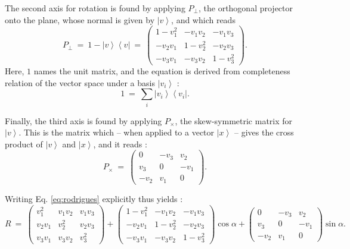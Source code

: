 The second axis for rotation is found by applying $P_{\perp}$, the orthogonal projector onto the plane, 
whose normal is given by $\left|v\right>$, and which reads \cite[p. 814]{Arens2015}
\begin{equation}
	P_{\perp} \ =\ 1 - \left|v\right> \left<v\right| \ =\ 
		\left( \begin{array}{ccc} 
			1 - v_1^2    &      - v_1 v_2 &         - v_1 v_3 \\
			   - v_2 v_1 &      1 - v_2^2 &         - v_2 v_3 \\
			   - v_3 v_1 &      - v_3 v_2 &         1 - v_3^2
		\end{array} \right).
\end{equation}
Here, $1$ names the unit matrix, and the equation is derived from completeness relation of the vector space under
a basis $\left| v_i \right>$ \cite[p. 814]{Arens2015}:
\begin{equation}
	1 \ =\  \sum_i \left| v_i \right> \left< v_i \right|.
\end{equation}

Finally, the third axis is found by applying $P_{\times}$, the skew-symmetric matrix for $\left|v\right>$.
This is the matrix which -- when applied to a vector $\left|x\right>$ -- gives the cross product of $\left|v\right>$ and $\left|x\right>$, 
and it reads \cite{wiki_skewsymm}:
\begin{equation}
	P_{\times} \ =\ 
		\left( \begin{array}{ccc} 
			0       & -v_3 &  v_2 \\
			v_3   & 0      & -v_1 \\
			-v_2  & v_1  & 0
		\end{array} \right).
\end{equation}

Writing Eq. \ref{eq:rodrigues} explicitly thus yields \cite[p. 718, p. 816]{Arens2015}:
\begin{equation}
	R \ = \ 
		\left( \begin{array}{ccc} 
			v_1^2    &    v_1 v_2 &       v_1 v_3 \\
			v_2 v_1 &       v_2^2 &       v_2 v_3 \\
			v_3 v_1 &    v_3 v_2 &          v_3^2
		\end{array} \right)
	+ 	\left( \begin{array}{ccc} 
			1 - v_1^2    &      - v_1 v_2 &         - v_1 v_3 \\
			   - v_2 v_1 &      1 - v_2^2 &         - v_2 v_3 \\
			   - v_3 v_1 &      - v_3 v_2 &         1 - v_3^2
		\end{array} \right)
		\cos \alpha 
	 + 
		\left( \begin{array}{ccc} 
			0       & -v_3 &  v_2 \\
			v_3   & 0      & -v_1 \\
			-v_2  & v_1  & 0
		\end{array} \right)
		\sin \alpha.
	\label{eq:rodrigues}
\end{equation}


